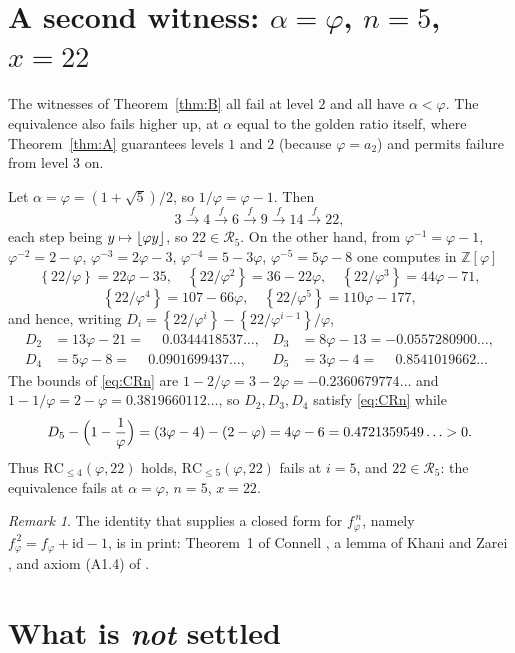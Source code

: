\documentclass[11pt]{amsart}
\theoremstyle{remark}
\newtheorem*{remark}{Remark}
\DeclarePairedDelimiter{\fl}{\lfloor}{\rfloor}
\newcommand{\fp}[1]{\left\{#1\right\}}
\newcommand{\RC}{\mathrm{RC}}
\begin{document}
\section{A second witness: \texorpdfstring{$\alpha=\varphi$, $n=5$, $x=22$}{alpha=phi, n=5, x=22}}
\label{sec:phi}

The witnesses of Theorem~\ref{thm:B} all fail at level $2$ and all have
$\alpha<\varphi$. The equivalence also fails higher up, at $\alpha$ equal to the golden
ratio itself, where Theorem~\ref{thm:A} guarantees levels $1$ and $2$ (because
$\varphi=a_2$) and permits failure from level $3$ on.

Let $\alpha=\varphi=(1+\sqrt5)/2$, so $1/\varphi=\varphi-1$. Then
\[
 3\xrightarrow{\ f\ }4\xrightarrow{\ f\ }6\xrightarrow{\ f\ }9
 \xrightarrow{\ f\ }14\xrightarrow{\ f\ }22,
\]
each step being $y\mapsto\fl{\varphi y}$, so $22\in\mathcal R_5$. On the other hand, from
$\varphi^{-1}=\varphi-1$, $\varphi^{-2}=2-\varphi$, $\varphi^{-3}=2\varphi-3$,
$\varphi^{-4}=5-3\varphi$, $\varphi^{-5}=5\varphi-8$ one computes in $\mathbb Z[\varphi]$
\[
 \fp{22/\varphi}=22\varphi-35,\quad
 \fp{22/\varphi^{2}}=36-22\varphi,\quad
 \fp{22/\varphi^{3}}=44\varphi-71,
\]
\[
 \fp{22/\varphi^{4}}=107-66\varphi,\quad
 \fp{22/\varphi^{5}}=110\varphi-177,
\]
and hence, writing $D_i=\fp{22/\varphi^{i}}-\fp{22/\varphi^{i-1}}/\varphi$,
\begin{align*}
 D_2&=13\varphi-21=\phantom{-}0.0344418537\ldots, &
 D_3&=8\varphi-13=-0.0557280900\ldots,\\
 D_4&=5\varphi-8=\phantom{-}0.0901699437\ldots, &
 D_5&=3\varphi-4=\phantom{-}0.8541019662\ldots
\end{align*}
The bounds of \eqref{eq:CRn} are $1-2/\varphi=3-2\varphi=-0.2360679774\ldots$ and
$1-1/\varphi=2-\varphi=0.3819660112\ldots$, so $D_2,D_3,D_4$ satisfy \eqref{eq:CRn}
while
\[
 D_5-\Bigl(1-\frac1\varphi\Bigr)=(3\varphi-4)-(2-\varphi)=4\varphi-6
 =0.4721359549\ldots>0 .
\]
Thus $\RC_{\le4}(\varphi,22)$ holds, $\RC_{\le5}(\varphi,22)$ fails at $i=5$, and
$22\in\mathcal R_5$: the equivalence fails at $\alpha=\varphi$, $n=5$, $x=22$.

\begin{remark}
The identity that supplies a closed form for $f_\varphi^{\,n}$,
namely $f_\varphi^{\,2}=f_\varphi+\mathrm{id}-1$, is in print: Theorem~1 of Connell
\cite{Connell}, a lemma of Khani and Zarei \cite{KhaniZarei}, and axiom (A1.4)
of \cite{KVZ-Fib}.
\end{remark}

\section{What is \emph{not} settled}\label{sec:open}
\end{document}
